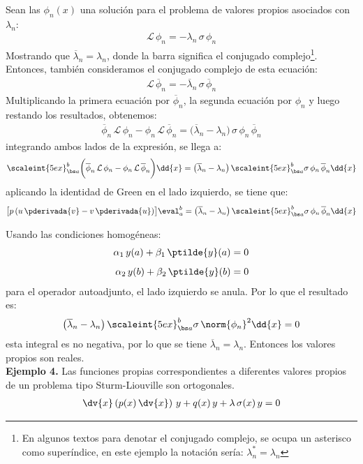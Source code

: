 Sean las $\phi_{n}(x)$ una solución para el problema de valores propios asociados con $\lambda_{n}$:
\begin{align*}
\mathcal{L} \, \phi_{n} = - \lambda_{n} \, \sigma \, \phi_{n}
\end{align*}
Mostrando que $\overline{\lambda}_{n} = \lambda_{n}$, donde la barra significa el conjugado complejo\footnote{En algunos textos para denotar el conjugado complejo, se ocupa un asterisco como superíndice, en este ejemplo la notación sería: $\lambda_{n}^{*} = \lambda_{n}$}. Entonces, también consideramos el conjugado complejo de esta ecuación:
\begin{align*}
\mathcal{L} \, \overline{\phi}_{n} = - \overline{\lambda}_{n} \, \sigma \, \overline{\phi}_{n}
\end{align*}
Multiplicando la primera ecuación por $\overline{\phi}_{n}$, la segunda ecuación por $\phi_{n}$ y luego restando los resultados, obtenemos:
\begin{align*}
\overline{\phi}_{n} \, \mathcal{L} \, \phi_{n} - \phi_{n} \, \mathcal{L} \, \overline{\phi}_{n} = \big( \overline{\lambda}_{n} - \lambda_{n} \big) \, \sigma \, \phi_{n} \, \overline{\phi}_{n}
\end{align*}
integrando ambos lados de la expresión, se llega a:
\begin{align*}
\scaleint{5ex}_{\bs a}^{b} \bigg( \overline{\phi}_{n} \, \mathcal{L} \, \phi_{n} - \phi_{n} \, \mathcal{L} \, \overline{\phi}_{n} \bigg) \dd{x} = \big( \overline{\lambda}_{n} - \lambda_{n} \big) \, \scaleint{5ex}_{\bs a}^{b} \sigma \, \phi_{n} \, \overline{\phi}_{n} \dd{x}
\end{align*}
aplicando la identidad de Green en el lado izquierdo, se tiene que:
\begin{align*}
\big[ p \, (u \, \pderivada{v} - v \, \pderivada{u}) \big]\eval_{a}^{b} = \big( \overline{\lambda}_{n} - \lambda_{n} \big) \, \scaleint{5ex}_{\bs a}^{b} \sigma \, \phi_{n} \, \overline{\phi}_{n} \dd{x}
\end{align*}

Usando las condiciones homogéneas:
\begin{align*}
\alpha_{1} \, y(a) + \beta_{1} \, \ptilde{y} (a) &= 0 \\[0.5em]
\alpha_{2} \, y(b) + \beta_{2} \, \ptilde{y} (b) &= 0
\end{align*}
para el operador autoadjunto, el lado izquierdo se anula. Por lo que el resultado es:
\begin{align*}
\big( \overline{\lambda}_{n} - \lambda_{n} \big) \, \scaleint{5ex}_{\bs a}^{b} \sigma \, \norm{\phi_{n}}^{2} \dd{x} = 0
\end{align*}
esta integral es no negativa, por lo que se tiene $\overline{\lambda}_{n} = \lambda_{n}$. Entonces los valores propios son reales.
\\
\noindent
\textbf{Ejemplo 4.} Las funciones propias correspondientes a diferentes valores propios de un problema tipo Sturm-Liouville son ortogonales.
\begin{align*}
\dv{x} \left( p(x) \, \dv{x} \right) \, y + q(x) \, y + \lambda \, \sigma (x) \, y = 0
\end{align*}

